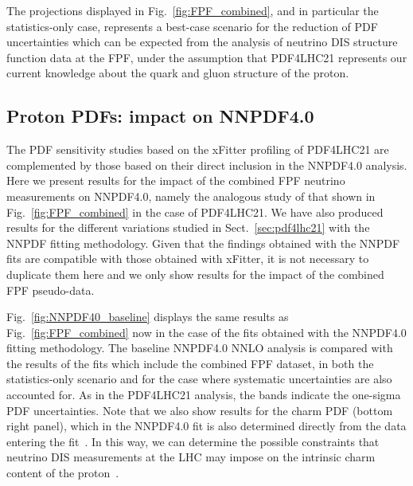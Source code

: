 The projections displayed in
Fig.~\ref{fig:FPF_combined}, and in particular the statistics-only case, represents
a best-case scenario for the reduction of PDF uncertainties which can be expected from
the analysis of neutrino DIS structure function data at the FPF,
under the assumption that PDF4LHC21 represents
our current knowledge about the quark and gluon structure of the proton.

\subsection{Proton PDFs: impact on NNPDF4.0}
\label{sec:nnpdf40}

The PDF sensitivity studies based on the {\sc\small xFitter} profiling
of PDF4LHC21 are complemented by those based on their direct inclusion
in the NNPDF4.0 analysis.
%
Here we present results for the impact of the combined FPF neutrino
measurements on NNPDF4.0, namely the analogous study of that shown
in Fig.~\ref{fig:FPF_combined} in the case of PDF4LHC21.
%
We have also produced results for the different variations studied in
Sect.~\ref{sec:pdf4lhc21} with the NNPDF fitting methodology.
%
Given that the findings obtained with the NNPDF fits
are compatible with those obtained with {\sc\small xFitter}, it is not necessary to duplicate them here
and we only show results for the impact of the combined FPF pseudo-data.

Fig.~\ref{fig:NNPDF40_baseline} displays the
same results as Fig.~\ref{fig:FPF_combined} now in the case of the
fits obtained with the NNPDF4.0 fitting methodology.
%
The baseline NNPDF4.0 NNLO analysis is compared
with the results of the fits which include the combined FPF dataset,
in both the statistics-only scenario and for the case
where systematic uncertainties are also accounted for.
%
As in the PDF4LHC21 analysis, the bands indicate the one-sigma PDF uncertainties.
%
Note that we also show results for the charm PDF (bottom right panel), which
in the NNPDF4.0 fit is also determined directly from the data entering
the fit~\cite{Ball:2016neh}.
%
In this way, we can determine the possible constraints that neutrino
DIS measurements at the LHC may impose on the intrinsic charm
content of the proton~\cite{Ball:2022qks}.

